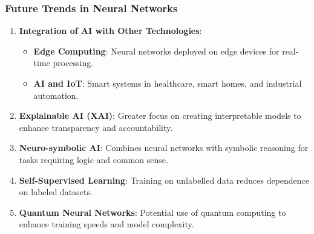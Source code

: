 \documentclass{beamer}
\begin{document}
\begin{frame}[fragile]
    \frametitle{Future Trends in Neural Networks}
    
    \begin{enumerate}
        \item \textbf{Integration of AI with Other Technologies}:
        \begin{itemize}
            \item \textbf{Edge Computing}: Neural networks deployed on edge devices for real-time processing.
            \item \textbf{AI and IoT}: Smart systems in healthcare, smart homes, and industrial automation.
        \end{itemize}
        
        \item \textbf{Explainable AI (XAI)}: Greater focus on creating interpretable models to enhance transparency and accountability.
        
        \item \textbf{Neuro-symbolic AI}: Combines neural networks with symbolic reasoning for tasks requiring logic and common sense.
        
        \item \textbf{Self-Supervised Learning}: Training on unlabelled data reduces dependence on labeled datasets.
        
        \item \textbf{Quantum Neural Networks}: Potential use of quantum computing to enhance training speeds and model complexity.
    \end{enumerate}
\end{frame}
\end{document}
